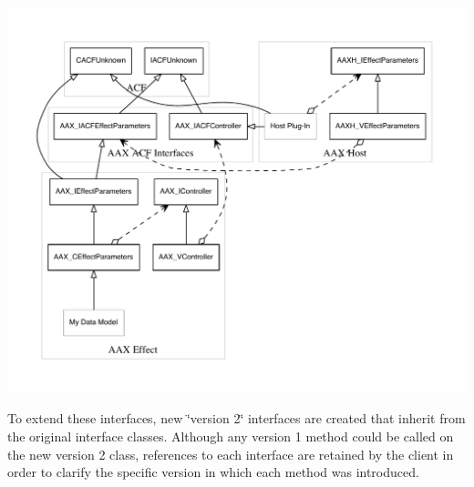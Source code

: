 \begin{DoxyImage}
\includegraphics[width=\textwidth,height=\textheight/2,keepaspectratio=true]{dot_aax_acf_versioning_full}
\caption{A\+C\+F interfaces\+: A\+A\+X\+\_\+\+I\+A\+C\+F\+Effect\+Parameters and A\+A\+X\+\_\+\+I\+A\+C\+F\+Controller (with possible host design)}
\end{DoxyImage}
 To extend these interfaces, new \char`\"{}version 2\char`\"{} interfaces are created that inherit from the original interface classes. Although any version 1 method could be called on the new version 2 class, references to each interface are retained by the client in order to clarify the specific version in which each method was introduced.


